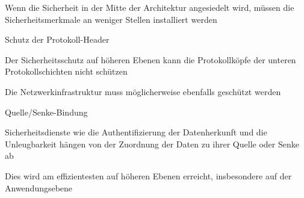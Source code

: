 \documentclass[a4paper]{article}
\begin{document}
\begin{multicols}{3}
\begin{itemize*}
\begin{itemize*}
                  \item Wenn die Sicherheit in der Mitte der Architektur angesiedelt wird, müssen die Sicherheitsmerkmale an weniger Stellen installiert werden
            \end{itemize*}
            \item Schutz der Protokoll-Header
            \begin{itemize*}
                  \item Der Sicherheitsschutz auf höheren Ebenen kann die Protokollköpfe der unteren Protokollschichten nicht schützen
                  \item Die Netzwerkinfrastruktur muss möglicherweise ebenfalls geschützt werden
            \end{itemize*}
            \item Quelle/Senke-Bindung
            \begin{itemize*}
                  \item Sicherheitsdienste wie die Authentifizierung der Datenherkunft und die Unleugbarkeit hängen von der Zuordnung der Daten zu ihrer Quelle oder Senke ab
                  \item Dies wird am effizientesten auf höheren Ebenen erreicht, insbesondere auf der Anwendungsebene
            \end{itemize*}
      \end{itemize*}


\end{multicols}
\end{document}
